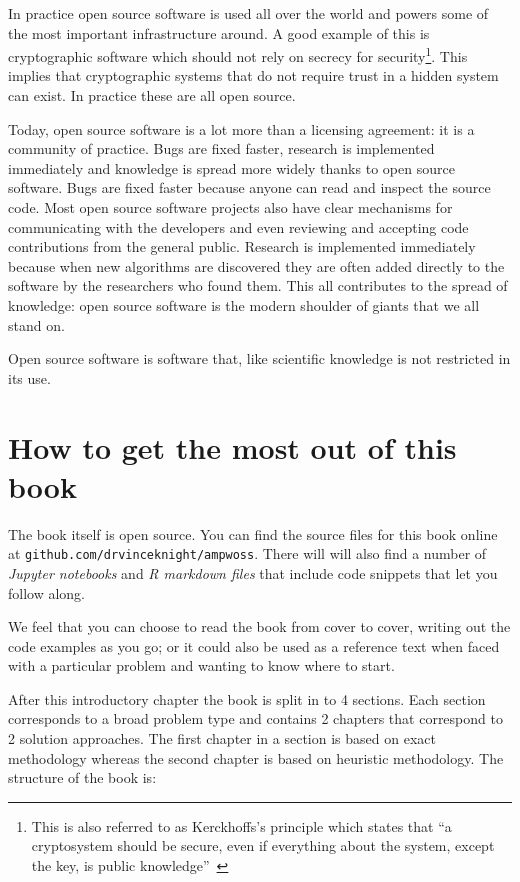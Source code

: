 In practice open source software is used all over the world and powers
some of the most important infrastructure around.
A good example of this is cryptographic software which should not rely on
secrecy for security\footnote{This
is also referred to as Kerckhoffs's principle which states that ``a cryptosystem
should be secure, even if everything about the system, except the key, is public
knowledge''~\cite{kerckhoffs1883cryptographie}}. This implies that
cryptographic systems that do not require trust in a hidden system can exist.
In practice these are all open source.

Today, open source software is a lot more than a licensing agreement:
it is a community of practice. Bugs are fixed faster, research is
implemented immediately and knowledge is spread more widely thanks to
open source software. Bugs are fixed faster because anyone can read and
inspect the source code. Most open source software projects also have
clear mechanisms for communicating with the developers and even
reviewing and accepting code contributions from the general public.
Research is implemented immediately because when new algorithms are
discovered they are often added directly to the software by the
researchers who found them. This all contributes to the spread of
knowledge: open source software is the modern shoulder of giants that
we all stand on.

Open source software is software that, like scientific knowledge is not
restricted in its use.

\section{How to get the most out of this
book}\label{sec:how-to-get-the-most-out-of-this-book}

The book itself is open source. You can find the source files for this
book online at \texttt{github.com/drvinceknight/ampwoss}. There will will
also find a number of \emph{Jupyter notebooks} and \emph{R markdown
files} that include code snippets that let you follow along.

We feel that you can choose to read the book from cover to cover,
writing out the code examples as you go; or it could also be used as a
reference text when faced with a particular problem and wanting to know
where to start.

After this introductory chapter the book is split in to 4 sections.
Each section corresponds to a broad problem type and contains 2 chapters that
correspond to 2 solution approaches. The first chapter in a section is based on
exact methodology whereas the second chapter is based on heuristic
methodology.
The structure of the book is:

